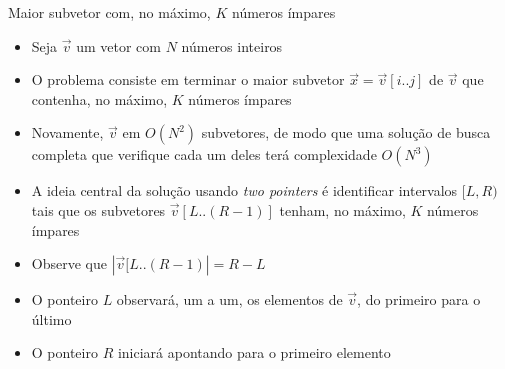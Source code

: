 \begin{frame}[fragile]{Maior subvetor com, no máximo, $K$ números ímpares}

    \begin{itemize}
        \item Seja $\vec{v}$ um vetor com $N$ números inteiros

        \item O problema consiste em terminar o maior subvetor $\vec{x} = \vec{v}[i..j]$ de 
            $\vec{v}$ que contenha, no máximo, $K$ números ímpares

        \item Novamente, $\vec{v}$ em $O(N^2)$ subvetores, de modo que uma solução de busca
            completa que verifique cada um deles terá complexidade $O(N^3)$

        \item A ideia central da solução usando \textit{two pointers} é identificar intervalos
            $[L, R)$ tais que os subvetores $\vec{v}[L..(R - 1)]$ tenham, no máximo, $K$ números
            ímpares

        \item Observe que $|\vec{v}[L..(R-1)| = R - L$
 
        \item O ponteiro $L$ observará, um a um, os elementos de $\vec{v}$, do primeiro para o 
            último

        \item O ponteiro $R$ iniciará apontando para o primeiro elemento
    \end{itemize}

\end{frame}

